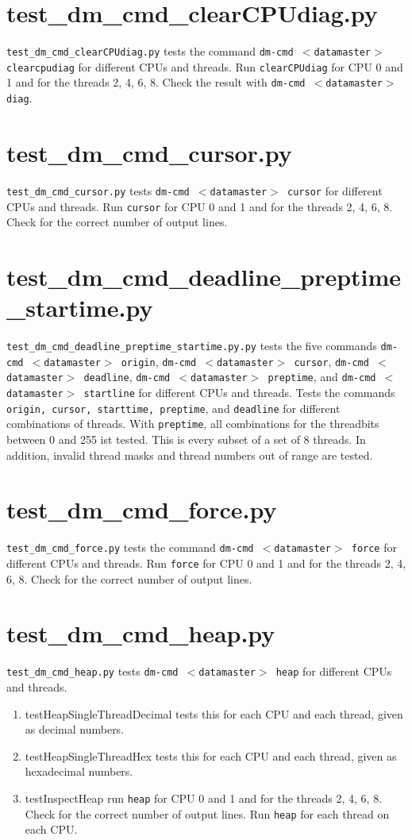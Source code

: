 \documentclass[12pt,a4paper]{report}
\begin{document}
\section{test\_dm\_cmd\_clearCPUdiag.py}
\texttt{test\_dm\_cmd\_clearCPUdiag.py} tests the command \texttt{dm-cmd
$<$datamaster$>$ clearcpudiag} for different CPUs and threads.
Run \texttt{clearCPUdiag} for CPU 0 and 1 and for the threads 2, 4, 6, 8.
Check the result with \texttt{dm-cmd $<$datamaster$>$ diag}.

\section{test\_dm\_cmd\_cursor.py}
\texttt{test\_dm\_cmd\_cursor.py} tests \texttt{dm-cmd $<$datamaster$>$ cursor} for different CPUs and threads.
Run \texttt{cursor} for CPU 0 and 1 and for the threads 2, 4, 6, 8.
Check for the correct number of output lines.

\section{test\_dm\_cmd\_deadline\_preptime\_startime.py}
\texttt{test\_dm\_cmd\_deadline\_preptime\_startime.py.py} tests the five commands
\texttt{dm-cmd $<$datamaster$>$ origin},
\texttt{dm-cmd $<$datamaster$>$ cursor},
\texttt{dm-cmd $<$datamaster$>$ deadline},
\texttt{dm-cmd $<$datamaster$>$ preptime}, and
\texttt{dm-cmd $<$datamaster$>$ startline}
for different CPUs and threads.
Tests the commands \texttt{origin, cursor, starttime, preptime}, and
\texttt{deadline} for different combinations  of threads.
With \texttt{preptime}, all combinations for the threadbits between 0
and 255 ist tested. This is every subset of a
set of 8 threads. In addition, invalid thread masks and thread numbers
out of range are tested.

\section{test\_dm\_cmd\_force.py}
\texttt{test\_dm\_cmd\_force.py} tests the command \texttt{dm-cmd
$<$datamaster$>$ force} for different CPUs and threads.
Run \texttt{force} for CPU 0 and 1 and for the threads 2, 4, 6, 8.
Check for the correct number of output lines.

\section{test\_dm\_cmd\_heap.py}
\texttt{test\_dm\_cmd\_heap.py} tests \texttt{dm-cmd $<$datamaster$>$ heap} for different CPUs and threads.
\begin{enumerate}
\item testHeapSingleThreadDecimal tests this for each CPU and each thread, given as decimal numbers.
\item testHeapSingleThreadHex tests this for each CPU and each thread, given as hexadecimal numbers.
\item testInspectHeap run \texttt{heap} for CPU 0 and 1 and for the
threads 2, 4, 6, 8. Check for the correct number of output lines.
Run \texttt{heap} for each thread on each CPU.
\end{enumerate}
\end{document}
